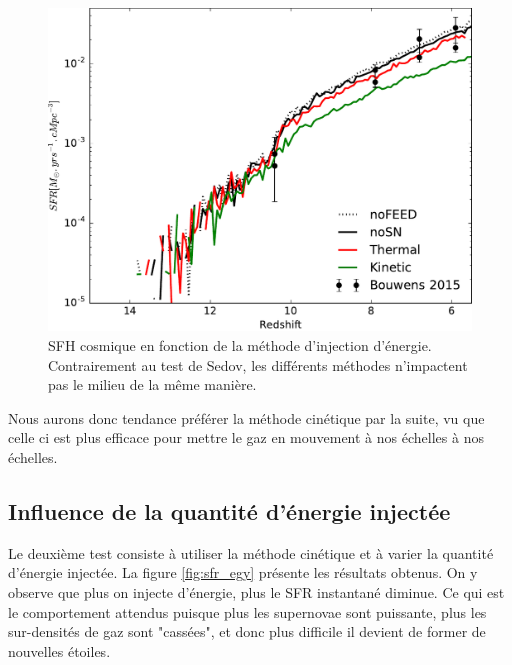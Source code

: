 \begin{figure}
        \includegraphics[width=.95\textwidth]{img/03/sedov/SFRmethode.pdf} 
        \caption[SFH cosmique en fonction de la méthode d'injection d'énergie]{SFH cosmique en fonction de la méthode d'injection d'énergie.
        Contrairement au test de Sedov, les différents méthodes n'impactent pas le milieu de la même manière.
        }
 		\label{fig:sfr_methode}
\end{figure}

Nous aurons donc tendance préférer la méthode cinétique par la suite, vu que celle ci est plus efficace pour mettre le gaz en mouvement à nos échelles à nos échelles.

\subsection{Influence de la quantité d'énergie injectée}
Le deuxième test consiste à utiliser la méthode cinétique et à varier la quantité d'énergie injectée.
La figure \ref{fig:sfr_egy} présente les résultats obtenus.
On y observe que plus on injecte d'énergie, plus le \ac{SFR} instantané diminue.
Ce qui est le comportement attendus puisque plus les supernovae sont puissante, plus les sur-densités de gaz sont "cassées", et donc plus difficile il devient de former de nouvelles étoiles.

